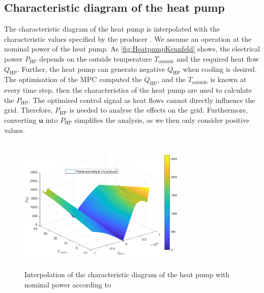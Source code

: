 \subsection{Characteristic diagram of the heat pump}
\label{subsec:charcteristicDiagramHP}
The characteristic diagram of the heat pump is interpolated with the characteristic values specified by the producer \cite{TUM}. We assume an operation at the nominal power of the heat pump. As \autoref{fig:HeatpumpKennfeld} shows, the electrical power $P_\text{HP}$ depends on the outside temperature $T_\text{outside}$ and the required heat flow $\dot{Q}_\text{HP}$. Further, the heat pump can generate negative $\dot{Q}_\text{HP}$ when cooling is desired. The optimisation of the MPC computed the $\dot{Q}_\text{HP}$, and the $T_\text{outside}$ is known at every time step, then the characteristics of the heat pump are used to calculate the $P_\text{HP}$. The optimised control signal as heat flows cannot directly influence the grid. Therefore, $P_\text{HP}$ is needed to analyse the effects on the grid. Furthermore, converting $\mathbf{u}$ into $P_\text{HP}$ simplifies the analysis, as we then only consider positive values.
    \begin{figure}[h]
            \centering
            \includegraphics[width=8cm,height=6.5cm]{figure/HeatPumpV55nenn.eps}
           \caption{Interpolation of the characteristic diagram of the heat pump with nominal power according to \cite{TUM}}
           \label{fig:HeatpumpKennfeld}
    \end{figure}
    
